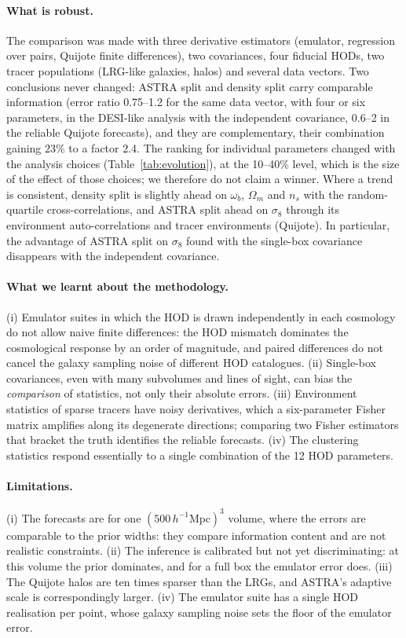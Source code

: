 \documentclass[11pt,twocolumn]{article}
\newcommand{\Mpch}{\,h^{-1}\mathrm{Mpc}}
\begin{document}
\paragraph{What is robust.} The comparison was made with three derivative estimators (emulator, regression over pairs, Quijote finite differences), two covariances, four fiducial HODs, two tracer populations (LRG-like galaxies, halos) and several data vectors. Two conclusions never changed: ASTRA split and density split carry comparable information (error ratio 0.75--1.2 for the same data vector, with four or six parameters, in the DESI-like analysis with the independent covariance, 0.6--2 in the reliable Quijote forecasts), and they are complementary, their combination gaining 23\% to a factor 2.4. The ranking for individual parameters changed with the analysis choices (Table~\ref{tab:evolution}), at the 10--40\% level, which is the size of the effect of those choices; we therefore do not claim a winner. Where a trend is consistent, density split is slightly ahead on $\omega_b$, $\Omega_m$ and $n_s$ with the random-quartile cross-correlations, and ASTRA split ahead on $\sigma_8$ through its environment auto-correlations and tracer environments (Quijote). In particular, the advantage of ASTRA split on $\sigma_8$ found with the single-box covariance disappears with the independent covariance.

\paragraph{What we learnt about the methodology.} (i) Emulator suites in which the HOD is drawn independently in each cosmology do not allow naive finite differences: the HOD mismatch dominates the cosmological response by an order of magnitude, and paired differences do not cancel the galaxy sampling noise of different HOD catalogues. (ii) Single-box covariances, even with many subvolumes and lines of sight, can bias the \emph{comparison} of statistics, not only their absolute errors. (iii) Environment statistics of sparse tracers have noisy derivatives, which a six-parameter Fisher matrix amplifies along its degenerate directions; comparing two Fisher estimators that bracket the truth identifies the reliable forecasts. (iv) The clustering statistics respond essentially to a single combination of the 12 HOD parameters.

\paragraph{Limitations.} (i) The forecasts are for one $(500\Mpch)^3$ volume, where the errors are comparable to the prior widths: they compare information content and are not realistic constraints. (ii) The inference is calibrated but not yet discriminating: at this volume the prior dominates, and for a full box the emulator error does. (iii) The Quijote halos are ten times sparser than the LRGs, and ASTRA's adaptive scale is correspondingly larger. (iv) The emulator suite has a single HOD realisation per point, whose galaxy sampling noise sets the floor of the emulator error.
\end{document}
